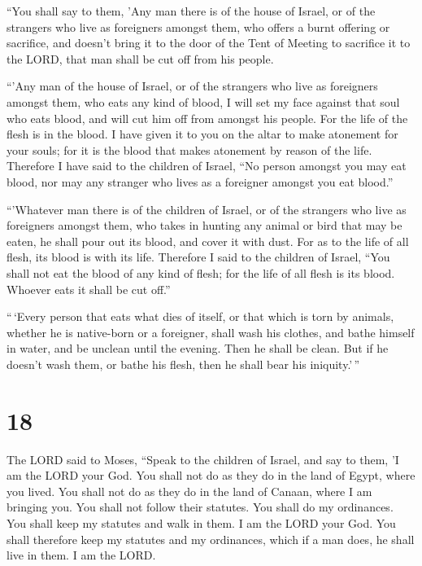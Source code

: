  ``You shall say to them, 'Any man there is of the house
of Israel, or of the strangers who live as foreigners amongst them, who
offers a burnt offering or sacrifice,  and doesn't bring
it to the door of the Tent of Meeting to sacrifice it to the LORD, that
man shall be cut off from his people.

 ``'Any man of the house of Israel, or of the strangers
who live as foreigners amongst them, who eats any kind of blood, I will
set my face against that soul who eats blood, and will cut him off from
amongst his people.  For the life of the flesh is in the
blood. I have given it to you on the altar to make atonement for your
souls; for it is the blood that makes atonement by reason of the life.
 Therefore I have said to the children of Israel, ``No
person amongst you may eat blood, nor may any stranger who lives as a
foreigner amongst you eat blood.''

 ``'Whatever man there is of the children of Israel, or
of the strangers who live as foreigners amongst them, who takes in
hunting any animal or bird that may be eaten, he shall pour out its
blood, and cover it with dust.  For as to the life of all
flesh, its blood is with its life. Therefore I said to the children of
Israel, ``You shall not eat the blood of any kind of flesh; for the life
of all flesh is its blood. Whoever eats it shall be cut off.''

 ``\,`Every person that eats what dies of itself, or that
which is torn by animals, whether he is native-born or a foreigner,
shall wash his clothes, and bathe himself in water, and be unclean until
the evening. Then he shall be clean.  But if he doesn't
wash them, or bathe his flesh, then he shall bear his iniquity.'\,''

\hypertarget{section-17}{%
\section{18}\label{section-17}}

 The LORD said to Moses,  ``Speak to the
children of Israel, and say to them, 'I am the LORD your God.
 You shall not do as they do in the land of Egypt, where
you lived. You shall not do as they do in the land of Canaan, where I am
bringing you. You shall not follow their statutes.  You
shall do my ordinances. You shall keep my statutes and walk in them. I
am the LORD your God.  You shall therefore keep my
statutes and my ordinances, which if a man does, he shall live in them.
I am the LORD.

